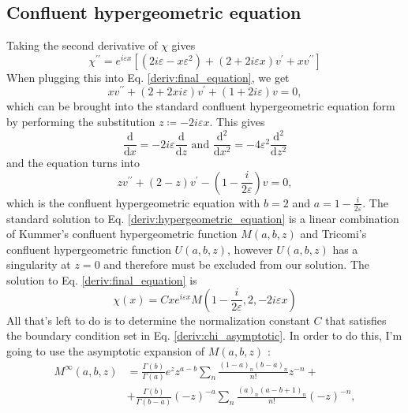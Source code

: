 \subsection{Confluent hypergeometric equation}
Taking the second derivative of \(\chi \) gives
\begin{equation}
	\chi ^{\prime\prime} = e^{i\varepsilon x} \left[ (2i\varepsilon - x \varepsilon ^2) + (2 + 2 i \varepsilon x ) v^{\prime} + x v^{\prime\prime}   \right] 
\end{equation}
When plugging this into Eq. \eqref{deriv:final_equation}, we get
\begin{equation}
	x v^{\prime\prime} + (2 + 2 x i \varepsilon ) v^{\prime} + (1 + 2i \varepsilon ) v = 0,
\end{equation}
which can be brought into the standard confluent hypergeometric equation form by performing the substitution \(z \coloneqq - 2i \varepsilon x\). This gives
\begin{equation}
	\frac{\mathrm{d}}{\mathrm{d}x} = - 2 i \varepsilon \frac{\mathrm{d}}{\mathrm{d}z} 
	\text{ and } 
	\frac{\mathrm{d}^2}{\mathrm{d}x^2} = - 4 \varepsilon ^2 \frac{\mathrm{d}^2}{\mathrm{d}z^2} 
\end{equation}
and the equation turns into
\begin{equation}\label{deriv:hypergeometric_equation}
	z v^{\prime\prime} + (2-z) v^{\prime} - \left( 1- \frac{i}{2\varepsilon } \right) v = 0,
\end{equation}
which is the confluent hypergeometric equation with \(b=2\) and \(a=1- \frac{i}{2\varepsilon }\).
The standard solution to Eq. \eqref{deriv:hypergeometric_equation} is a linear combination of Kummer's confluent hypergeometric function \(M(a,b,z)\) and Tricomi's confluent hypergeometric function \(U(a,b,z)\), however \(U(a,b,z)\) has a singularity at \(z=0\) and therefore must be excluded from our solution. The solution to Eq. \eqref{deriv:final_equation} is
\begin{equation}
	\chi (x) = Cxe^{i\varepsilon x} M\left(1-\frac{i}{2\varepsilon }, 2, -2i\varepsilon x\right)
\end{equation}
All that's left to do is to determine the normalization constant \(C\) that satisfies the boundary condition set in Eq. \eqref{deriv:chi_asymptotic}. In order to do this, I'm going to use the asymptotic expansion of \(M(a,b,z)\) \cite[\href{https://dlmf.nist.gov/13.7.E2}{(13.7.2)}]{NIST:DLMF}:
\begin{align}
	M^{\infty} (a,b,z)&= 
	\frac{\Gamma (b)}{\Gamma (a)} e^z z^{a-b} \sum_{n} \frac{(1-a)_n (b-a)_n}{n!}z^{-n} +\\
	&+ \frac{\Gamma (b)}{\Gamma (b-a)}(-z)^{-a} \sum_{n} \frac{(a)_n(a-b+1)_n}{n!}(-z)^{-n},
\end{align}
